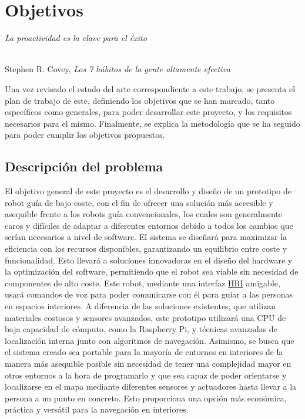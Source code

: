 \chapter{Objetivos}
\label{cap:capitulo3}

\begin{flushright}
\begin{minipage}[]{10cm}
\emph{La proactividad es la clave para el éxito}\\
\end{minipage}\\

Stephen R. Covey, \textit{Los 7 hábitos de la gente altamente efectiva}\\
\end{flushright}

\vspace{1cm}

Una vez revisado el estado del arte correspondiente a este trabajo, se presenta el plan de trabajo de este, definiendo los 
objetivos que se han marcado, tanto específicos como generales, para poder desarrollar este proyecto, y los requisitos necesarios para el mismo.
Finalmente, se explica la metodología que se ha seguido para poder cumplir los objetivos propuestos.



\section{Descripción del problema}
\label{sec:descripcion}


El objetivo general de este proyecto es el desarrollo y diseño de un prototipo de robot guía de bajo coste, con el fin de ofrecer una solución más accesible y asequible frente a los robots guía convencionales, los cuales son generalmente caros y difíciles de adaptar a diferentes entornos debido a todos los cambios que serían necesarios a nivel de software. El sistema se diseñará para maximizar la eficiencia con los recursos disponibles, garantizando un equilibrio entre coste y funcionalidad. Esto llevará a soluciones innovadoras en el diseño del hardware y la optimización del software, permitiendo que el robot sea viable sin necesidad de componentes de alto coste. Este robot, mediante una interfaz \hyperlink{HRI}{HRI} amigable, usará comandos de voz para poder comunicarse con él para guiar a las personas en espacios interiores. A diferencia de las soluciones existentes, que utilizan materiales costosos y sensores avanzados, este prototipo utilizará una CPU de baja capacidad de cómputo, como la Raspberry Pi, y técnicas avanzadas de localización interna  junto con algoritmos de navegación. Asimismo, se busca que el sistema creado sea portable para la mayoría de entornos en interiores de la manera más asequible posible sin necesidad de tener una complejidad mayor en otros entornos a la hora de programarlo y que sea capaz de poder orientarse y localizarse en el mapa mediante diferentes sensores y actuadores hasta llevar a la persona a un punto en concreto. Esto proporciona una opción más económica, práctica y versátil para la navegación en interiores.\\ 

